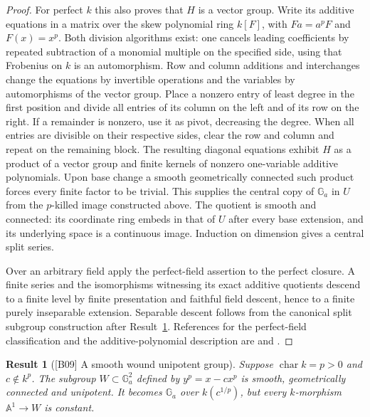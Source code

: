 \documentclass[11pt,a4paper,openany,oneside]{book}
\theoremstyle{resultstyle}
\newtheorem{statement}{Result}[chapter]
\newenvironment{result}[2]{\clubpenalty=10000\begin{statement}[\textnormal{[#1]} #2]\leavevmode\label{res:#1}\ignorespaces}{\end{statement}}
\theoremstyle{definition}
\numberwithin{equation}{chapter}
\begin{document}
\begin{proof}
For perfect \(k\) this also proves that \(H\) is a vector group.
Write its additive equations in a matrix over the skew polynomial
ring \(k[F]\), with \(Fa=a^p F\) and \(F(x)=x^p\). Both division
algorithms exist: one cancels leading coefficients by repeated
subtraction of a monomial multiple on the specified side, using
that Frobenius on \(k\) is an automorphism. Row and column additions
and interchanges change the equations by invertible operations
and the variables by automorphisms of the vector group. Place a
nonzero entry of least degree in the first position and divide
all entries of its column on the left and of its row on the right.
If a remainder is nonzero, use it as pivot, decreasing the degree.
When all entries are divisible on their respective sides, clear
the row and column and repeat on the remaining block. The resulting
diagonal equations exhibit \(H\) as a product of a vector group
and finite kernels of nonzero one-variable additive polynomials.
Upon base change a smooth geometrically connected such product
forces every finite factor to be trivial. This supplies the
central copy of \(\mathbb G_a\) in \(U\) from the \(p\)-killed
image constructed above. The quotient is smooth and connected:
its coordinate ring embeds in that of \(U\) after every base
extension, and its underlying space is a continuous image.
Induction on dimension gives a central split series.

Over an arbitrary field apply the perfect-field assertion to the
perfect closure. A finite series and the isomorphisms witnessing
its exact additive quotients descend to a finite level by finite
presentation and faithful field descent, hence to a finite
purely inseparable extension. Separable descent follows from
the canonical split subgroup construction after
Result~\ref{res:B09}. References for the perfect-field
classification and the additive-polynomial description are
\cite[Theorem 14.46, Propositions 14.49--14.54 and
14.61--14.66]{milne} and \cite[Proposition 5.2.10]{conradfeng}.
\end{proof}

\begin{result}{B09}{A smooth wound unipotent group}
Suppose \(\operatorname{char}k=p>0\) and \(c\notin k^p\).
The subgroup \(W\subset\mathbb G_a^2\) defined by
\(y^p=x-cx^p\) is smooth, geometrically connected and unipotent.
It becomes \(\mathbb G_a\) over \(k(c^{1/p})\), but every
\(k\)-morphism \(\mathbb A^1\to W\) is constant.
\end{result}
\end{document}
